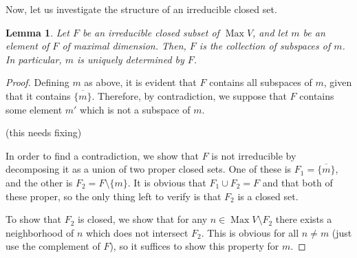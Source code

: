 \documentclass{article}
\theoremstyle{plain}
\newtheorem{lemma}{Lemma}
\theoremstyle{nonumberplain}
\newtheorem{proof}{Proof}
\DeclareMathOperator{\Max}{Max}
\begin{document}
Now, let us investigate the structure of an irreducible closed set.

\begin{lemma}
Let $F$ be an irreducible closed subset of $\Max V$, and let $m$ be an element of $F$ of maximal dimension. Then, $F$ is the collection of subspaces of $m$. In particular, $m$ is uniquely determined by $F$.
\end{lemma}

\begin{proof}
Defining $m$ as above, it is evident that $F$ contains all subspaces of $m$, given that it contains $\overline{\{m\}}$. Therefore, by contradiction, we suppose that $F$ contains some element $m'$ which is not a subspace of $m$.

(this needs fixing)

In order to find a contradiction, we show that $F$ is not irreducible by decomposing it as a union of two proper closed sets. One of these is $F_1 = \overline{\{m\}}$, and the other is $F_2 = F \setminus \{m\}$. It is obvious that $F_1 \cup F_2 = F$ and that both of these proper, so the only thing left to verify is that $F_2$ is a closed set.

To show that $F_2$ is closed, we show that for any $n \in \Max V \setminus F_2$ there exists a neighborhood of $n$ which does not intersect $F_2$. This is obvious for all $n \neq m$ (just use the complement of $F$), so it suffices to show this property for $m$.
\end{proof}

\nocite{measurement}

{}

\end{document}
